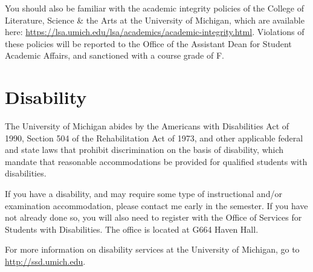 \documentclass[
]{article}
\begin{document}
You should also be familiar with the academic integrity policies of the
College of Literature, Science \& the Arts at the University of
Michigan, which are available here:
\url{https://lsa.umich.edu/lsa/academics/academic-integrity.html}.
Violations of these policies will be reported to the Office of the
Assistant Dean for Student Academic Affairs, and sanctioned with a
course grade of F.

\hypertarget{disability}{%
\section{Disability}\label{disability}}

The University of Michigan abides by the Americans with Disabilities Act
of 1990, Section 504 of the Rehabilitation Act of 1973, and other
applicable federal and state laws that prohibit discrimination on the
basis of disability, which mandate that reasonable accommodations be
provided for qualified students with disabilities.

If you have a disability, and may require some type of instructional
and/or examination accommodation, please contact me early in the
semester. If you have not already done so, you will also need to
register with the Office of Services for Students with Disabilities. The
office is located at G664 Haven Hall.

For more information on disability services at the University of
Michigan, go to \url{http://ssd.umich.edu}.
\end{document}
